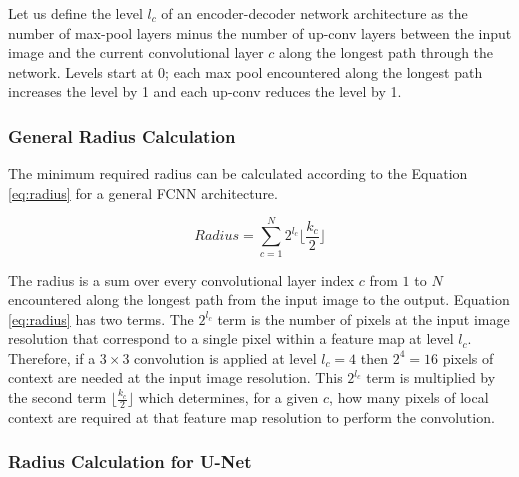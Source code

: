 \documentclass[runningheads]{llncs}
\begin{document}
Let us define the level $l_{c}$ of an encoder-decoder network architecture as the number of max-pool layers minus the number of up-conv layers between the input image and the current convolutional layer $c$ along the longest path through the network. Levels start at 0; each max pool encountered along the longest path increases the level by 1 and each up-conv reduces the level by 1. 


\subsubsection{General Radius Calculation}
The minimum required radius can be calculated according to the Equation \ref{eq:radius} for a general FCNN architecture. 

\begin{equation}
Radius = \sum_{c=1}^{N} 2^{l_c} \lfloor \frac{k_c}{2} \rfloor
\label{eq:radius}
\end{equation}

The radius is a sum over every convolutional layer index $c$ from $1$ to $N$ encountered along the longest path from the input image to the output.
Equation \ref{eq:radius} has two terms. The $2^{l_c}$ term is the number of pixels at the input image resolution that correspond to a single pixel within a feature map at level $l_c$. Therefore, if a $3 \times 3$ convolution is applied at level $l_c=4$ then $2^4 = 16$ pixels of context are needed at the input image resolution. This $2^{l_c}$ term is multiplied by the second term $\lfloor \frac{k_c}{2} \rfloor$ which determines, for a given $c$, how many pixels of local context are required at that feature map resolution to perform the convolution.

\subsubsection{Radius Calculation for U-Net}


\end{document}
